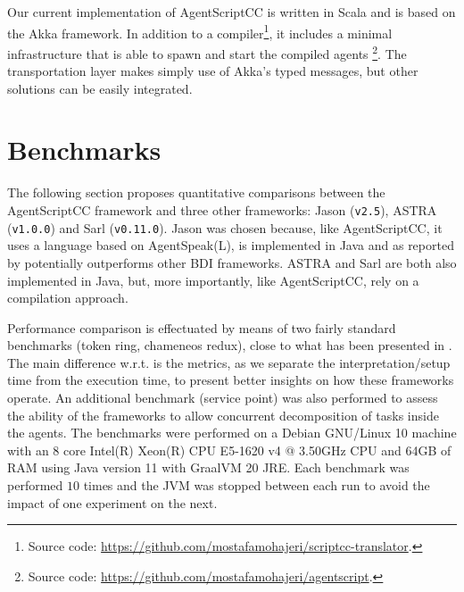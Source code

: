 Our current implementation of AgentScriptCC is written in Scala and is based on the Akka framework. In addition to a compiler\footnote{Source code: 
\url{https://github.com/mostafamohajeri/scriptcc-translator}.}, it includes a minimal infrastructure that is able to spawn and start the compiled agents%
\footnote{Source code: \url{https://github.com/mostafamohajeri/agentscript}.
}. The transportation layer makes simply use of Akka's typed messages, but other solutions can be easily integrated.

\section{Benchmarks}
\label{sec_bench}

The following section proposes quantitative comparisons between the AgentScriptCC framework and three other frameworks: Jason (\verb+v2.5+), ASTRA (\verb+v1.0.0+) and Sarl (\verb+v0.11.0+). Jason \cite{Bordini2005} was chosen because, like AgentScriptCC, it uses a language based on AgentSpeak(L), is implemented in Java and as reported by \cite{Cardoso2013} potentially outperforms other BDI frameworks. ASTRA and Sarl are both also implemented in Java, but, more importantly, like AgentScriptCC, rely on a compilation approach. %

Performance comparison is effectuated by means of two fairly standard benchmarks (token ring, chameneos redux), close to what has been presented in \cite{Cardoso2013}. The main difference w.r.t. \cite{Cardoso2013} is the metrics, as we separate the interpretation/setup time from the execution time, to present better insights on how these frameworks operate. %
An additional benchmark (service point) was also performed to assess the ability of the frameworks to allow concurrent decomposition of tasks inside the agents. The benchmarks were performed on a {Debian GNU/Linux 10} machine with an 8 core {Intel(R) Xeon(R) CPU E5-1620 v4 @ 3.50GHz} CPU and {64GB} of RAM using Java version {11} with {GraalVM 20} JRE.  Each benchmark was performed $10$ times and the JVM was stopped between each run to avoid the impact of one experiment on the next. %

